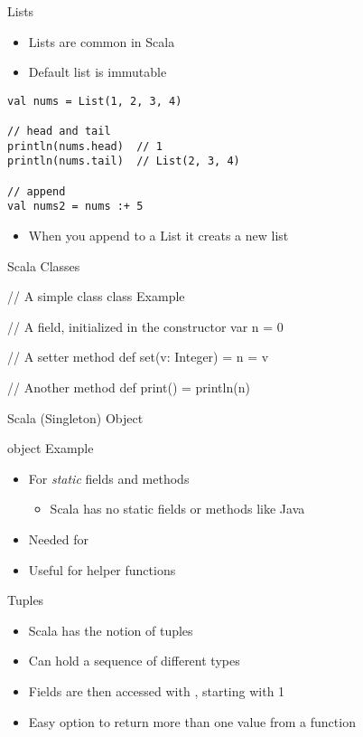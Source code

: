 \begin{frame}[fragile]{Lists}
\begin{itemize}
    \item Lists are common in Scala
    \item Default list is immutable
\end{itemize}

\begin{verbatim}
val nums = List(1, 2, 3, 4)

// head and tail
println(nums.head)  // 1
println(nums.tail)  // List(2, 3, 4)

// append
val nums2 = nums :+ 5
\end{verbatim}

\begin{itemize}
\item When you append to a List it creats a new list
\end{itemize}
\end{frame}

\begin{frame}[fragile]{Scala Classes}
\begin{chisel}
// A simple class
class Example {
  // A field, initialized in the constructor
  var n = 0
  
  // A setter method
  def set(v: Integer) = {
    n = v
  }
  
  // Another method
  def print() = {
    println(n)
  }
}
\end{chisel}
\end{frame}

\begin{frame}[fragile]{Scala (Singleton) Object}
\begin{chisel}
object Example {}
\end{chisel}
\begin{itemize}
\item For \emph{static} fields and methods
\begin{itemize}
\item Scala has no static fields or methods like Java
\end{itemize}
\item Needed for 
\item Useful for helper functions
\end{itemize}
\end{frame}

\begin{frame}[fragile]{Tuples}
\begin{itemize}
\item Scala has the notion of tuples
\item Can hold a sequence of different types
\item Fields are then accessed with , starting with 1
\item Easy option to return more than one value from a function
\end{itemize}
\end{frame}



